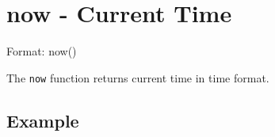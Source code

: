 
%

\section{now - Current Time\label{sect:now}}

Format: now()

The \verb|now| function returns current time in time format. 


\subsection*{Example}


%

